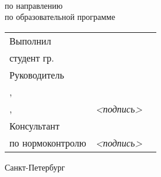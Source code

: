 \vspace{0pt plus2fill} %


{\centering%
	
	\MakeUppercase{\bfseries{}\DocType} \\ 
	\MakeUppercase{\bfseries{}\thesisDegree}%


\intervalS%
{\centering%
	\MakeUppercase{\bfseries{\thesisTitle}}}%

}\par%
{\centering
\intervalS%
    	по направлению \thesisSpecialtyCodeAndTitle{}\\%
по образовательной программе\\


\thesisOPCodeAndTitle %
\par%
}\par%




\vspace{4mm plus2fill}%

\noindent
\begin{tabularx}{\linewidth}{lXl}
	Выполнил              &	   &             \\
	студент гр.~\group     &    & \Author     \\[\mfloatsep]

	Руководитель 	    	  &    &             \\
	\SupervisorJob,	    	  &    &             \\
	\SupervisorDegree, \SupervisorTitle 	  &  \emph{<подпись>}  & \Supervisor \\[\mfloatsep]
	
	Консультант  &    &  \\   	
	по нормоконтролю                          &  \emph{<подпись>}  & \ConsultantNorm  %
\end{tabularx} %


%
\vspace{0pt plus4fill}%


\begin{center}%
Санкт-Петербург\\
\thesisYear
\end{center}%
\restoregeometry
\newpage